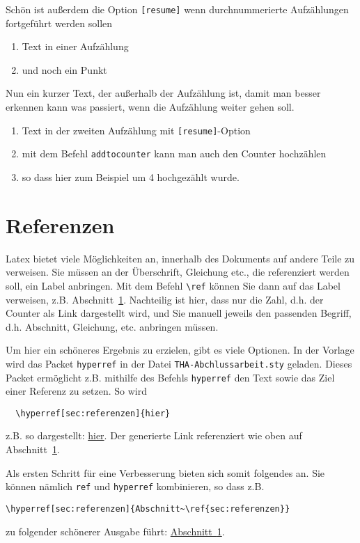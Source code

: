 Schön ist außerdem die Option \texttt{[resume]} wenn durchnummerierte Aufzählungen fortgeführt werden sollen
\begin{enumerate}
\item Text in einer Aufzählung
\item und noch ein Punkt
\end{enumerate}
%
Nun ein kurzer Text, der außerhalb der Aufzählung ist, damit man besser erkennen kann was passiert, wenn die Aufzählung weiter gehen soll.
%
\begin{enumerate}[resume]
\item Text in der zweiten Aufzählung mit \texttt{[resume]}-Option
\item mit dem Befehl \texttt{addtocounter} kann man auch den Counter hochzählen
\addtocounter{enumi}{4}
\item so dass hier zum Beispiel um 4 hochgezählt wurde.
\end{enumerate}

\section{Referenzen}\label{sec:referenzen}

Latex bietet viele Möglichkeiten an, innerhalb des Dokuments auf
andere Teile zu verweisen.  Sie müssen an der Überschrift, Gleichung
etc., die referenziert werden soll, ein Label anbringen. Mit dem
Befehl \verb|\ref| können Sie dann auf das Label verweisen, z.B.
Abschnitt~\ref{sec:referenzen}. Nachteilig ist hier, dass nur die
Zahl, d.h. der Counter als Link dargestellt wird, und Sie manuell
jeweils den passenden Begriff, d.h. Abschnitt, Gleichung, etc.
anbringen müssen. 

Um hier ein schöneres Ergebnis zu erzielen, gibt es viele Optionen. In
der Vorlage wird das Packet \verb|hyperref| in der Datei
\verb|THA-Abchlussarbeit.sty| geladen. Dieses Packet ermöglicht
z.B. mithilfe des Befehls \verb|hyperref| den Text sowie das Ziel
einer Referenz zu setzen.  So wird
\begin{lstlisting}
  \hyperref[sec:referenzen]{hier}
\end{lstlisting}
z.B. so dargestellt: \hyperref[sec:referenzen]{hier}.
Der generierte Link referenziert wie oben auf
Abschnitt~\ref{sec:referenzen}.

Als ersten Schritt für eine Verbesserung bieten sich somit folgendes an.
Sie können nämlich \verb|ref| und \verb|hyperref| kombinieren, so dass z.B.
\begin{lstlisting}
\hyperref[sec:referenzen]{Abschnitt~\ref{sec:referenzen}}  
\end{lstlisting}
zu folgender schönerer Ausgabe führt: 
\hyperref[sec:referenzen]{Abschnitt~\ref{sec:referenzen}}.

